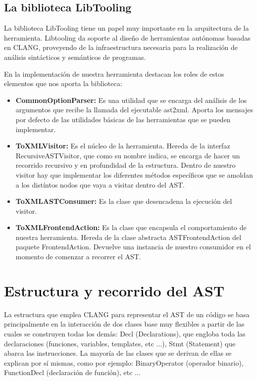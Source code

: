 \subsection{La biblioteca LibTooling}

La biblioteca LibTooling tiene un papel muy importante en la arquitectura de la herramienta. Libtooling da soporte al dise\~no de herramientas aut\'onomas basadas en CLANG, proveyendo de la infraestructura necesaria para la realizaci\'on de an\'alisis sint\'acticos y sem\'anticos de programas.

En la implementaci\'on de nuestra herramienta destacan los roles de estos elementos que nos aporta la biblioteca:

\begin{itemize}
\item \textbf{CommonOptionParser:} Es una utilidad que se encarga del an\'alisis de
los argumentos que recibe la llamada del ejecutable ast2xml. Aporta los
mensajes por defecto de las utilidades b\'asicas de las herramientas que
se pueden implementar.
\item \textbf{ToXMLVisitor:} Es el n\'ucleo de la herramienta. Hereda de la interfaz RecursiveASTVisitor, que como su nombre indica, se encarga de hacer un recorrido recursivo y en profundidad de la estructura. Dentro de nuestro visitor hay que implementar los diferentes m\'etodos espec\'ificos que se amoldan a los dist\'intos nodos que vaya a visitar dentro del AST.
\item \textbf{ToXMLASTConsumer:} Es la clase que desencadena la ejecuci\'on del visitor.
\item \textbf{ToXMLFrontendAction:} Es la clase que encapsula el comportamiento de nuestra herramienta. Hereda de la clase abstracta ASTFrontendAction del paquete FrontendAction. Devuelve una instancia de nuestro consumidor en el momento de comenzar a recorrer el AST.
\end{itemize}

\section{Estructura y recorrido del AST}

La estructura que emplea CLANG para representar el AST de un c\'odigo se basa principalmente en la interacci\'on de dos clases base muy flexibles a partir de las cuales se construyen todas los dem\'as: Decl (Declarations), que engloba toda las declaraciones (funciones, variables, templates, etc ...), Stmt (Statement) que abarca las instrucciones. La mayor\'ia de las clases que se derivan de ellas se explican por s\'i mismas, como por ejemplo: BinaryOperator (operador binario), FunctionDecl (declaraci\'on de funci\'on), etc ...


